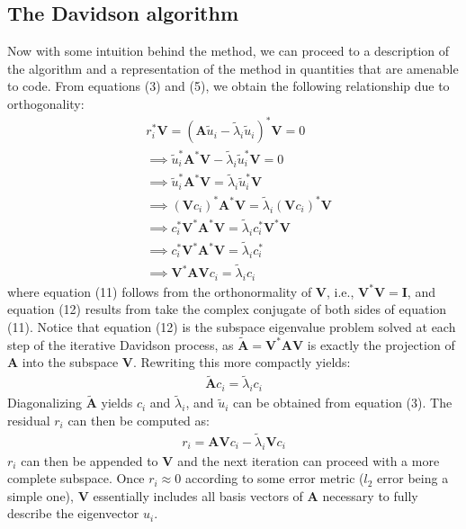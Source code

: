 \documentclass[12pt, fleqn]{article}
\begin{document}
\subsection*{The Davidson algorithm}
Now with some intuition behind the method, we can proceed to a description of the algorithm and a representation of the method in quantities that are amenable to code.
From equations (3) and (5), we obtain the following relationship due to orthogonality:
\begin{align}
    &r_i^* \mathbf{V} = (\mathbf{A} \tilde{u}_i - \tilde{\lambda}_i \tilde{u}_i)^* \mathbf{V} = 0 \\
    &\implies \tilde{u}_i^* \mathbf{A}^* \mathbf{V} - \tilde{\lambda}_i \tilde{u}_i^* \mathbf{V} = 0 \\
    &\implies \tilde{u}_i^* \mathbf{A}^* \mathbf{V} = \tilde{\lambda}_i \tilde{u}_i^* \mathbf{V} \\
    &\implies (\mathbf{V} c_i)^* \mathbf{A}^* \mathbf{V} = \tilde{\lambda}_i (\mathbf{V} c_i)^* \mathbf{V} \\
    &\implies c_i^* \mathbf{V}^* \mathbf{A}^* \mathbf{V} = \tilde{\lambda}_i c_i^* \mathbf{V}^* \mathbf{V} \\
    &\implies c_i^* \mathbf{V}^* \mathbf{A}^* \mathbf{V} = \tilde{\lambda}_i c_i^* \\
    &\implies \mathbf{V}^* \mathbf{A} \mathbf{V} c_i = \tilde{\lambda}_i c_i 
\end{align}
where equation (11) follows from the orthonormality of $\mathbf{V}$, i.e., $\mathbf{V}^* \mathbf{V} = \mathbf{I}$, and equation (12) results from take the complex conjugate of both sides of equation (11). 
Notice that equation (12) is the subspace eigenvalue problem solved at each step of the iterative Davidson process, as $\tilde{\mathbf{A}} = \mathbf{V}^* \mathbf{A} \mathbf{V}$ is exactly the projection of $\mathbf{A}$ into the subspace $\mathbf{V}$. 
Rewriting this more compactly yields:
\begin{align}
    \tilde{\mathbf{A}} c_i = \tilde{\lambda}_i c_i 
\end{align}
Diagonalizing $\tilde{\mathbf{A}}$ yields $c_i$ and $\tilde{\lambda}_i$, and $\tilde{u}_i$ can be obtained from equation (3).
The residual $r_i$ can then be computed as:
\begin{align}
    r_i = \mathbf{A} \mathbf{V} c_i - \tilde{\lambda}_i \mathbf{V} c_i
\end{align}
$r_i$ can then be appended to $\mathbf{V}$ and the next iteration can proceed with a more complete subspace.
Once $r_i \approx 0$ according to some error metric ($l_2$ error being a simple one), $\mathbf{V}$ essentially includes all basis vectors of $\mathbf{A}$ necessary to fully describe the eigenvector $u_i$. \newline
\end{document}
